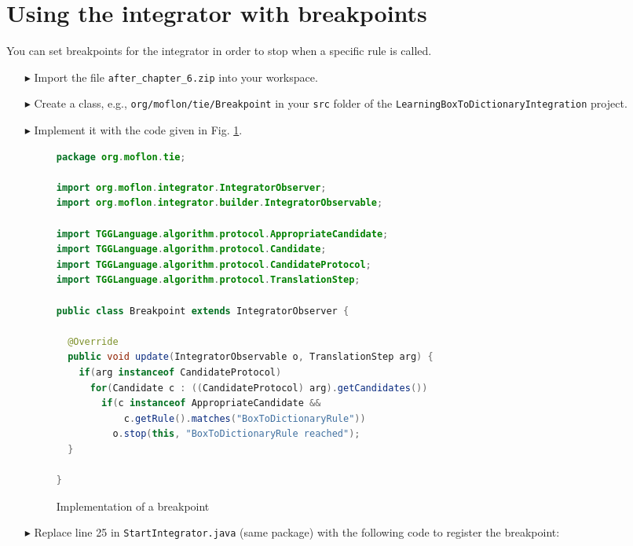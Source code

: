 \section{Using the integrator with breakpoints}
\label{sec:app_integrator}
You can set breakpoints for the integrator in order to stop when a specific rule is called. 

\begin{enumerate}
	\item[$\blacktriangleright$] Import the file \texttt{after\_chapter\_6.zip} into your workspace.
	\item[$\blacktriangleright$] Create a class, e.g., \texttt{org/moflon/tie/Breakpoint} in your \texttt{src} folder of the \texttt{LearningBoxToDictionaryIntegration} project.
	\item[$\blacktriangleright$] Implement it with the code given in Fig. \ref{fig:breakpoint_impl}.


\begin{figure}[htbp]
\begin{center}
\begin{lstlisting}[language=Java,backgroundcolor=\color{white}, keywordstyle={\bfseries\color{purple}}]
package org.moflon.tie;

import org.moflon.integrator.IntegratorObserver;
import org.moflon.integrator.builder.IntegratorObservable;

import TGGLanguage.algorithm.protocol.AppropriateCandidate;
import TGGLanguage.algorithm.protocol.Candidate;
import TGGLanguage.algorithm.protocol.CandidateProtocol;
import TGGLanguage.algorithm.protocol.TranslationStep;

public class Breakpoint extends IntegratorObserver {

  @Override
  public void update(IntegratorObservable o, TranslationStep arg) {
    if(arg instanceof CandidateProtocol)
      for(Candidate c : ((CandidateProtocol) arg).getCandidates())
        if(c instanceof AppropriateCandidate &&
            c.getRule().matches("BoxToDictionaryRule"))
          o.stop(this, "BoxToDictionaryRule reached");
  }

}

\end{lstlisting}
  \caption{Implementation of a breakpoint}
  \label{fig:breakpoint_impl}
\end{center}
\end{figure}
\FloatBarrier

	\item[$\blacktriangleright$] Replace line 25 in \texttt{StartIntegrator.java} (same package) with the following code to register the breakpoint:


\end{enumerate}
